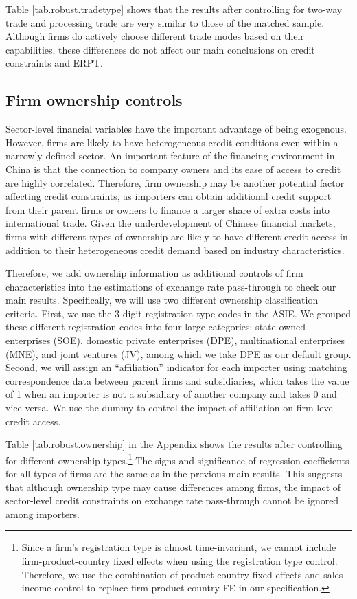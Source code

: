 Table \ref{tab.robust.tradetype} shows that the results after controlling for two-way trade and processing trade are very similar to those of the matched sample. Although firms do actively choose different trade modes based on their capabilities, these differences do not affect our main conclusions on credit constraints and ERPT.

\subsection{Firm ownership controls}

Sector-level financial variables have the important advantage of being exogenous. However, firms are likely to have heterogeneous credit conditions even within a narrowly defined sector. An important feature of the financing environment in China is that the connection to company owners and its ease of access to credit are highly correlated. Therefore, firm ownership may be another potential factor affecting credit constraints, as importers can obtain additional credit support from their parent firms or owners to finance a larger share of extra costs into international trade. Given the underdevelopment of Chinese financial markets, firms with different types of ownership are likely to have different credit access in addition to their heterogeneous credit demand based on industry characteristics. 

Therefore, we add ownership information as additional controls of firm characteristics into the estimations of exchange rate pass-through to check our main results. Specifically, we will use two different ownership classification criteria. First, we use the 3-digit registration type codes in the ASIE. We grouped these different registration codes into four large categories: state-owned enterprises (SOE), domestic private enterprises (DPE), multinational enterprises (MNE), and joint ventures (JV), among which we take DPE as our default group. Second, we will assign an ``affiliation'' indicator for each importer using matching correspondence data between parent firms and subsidiaries, which takes the value of 1 when an importer is not a subsidiary of another company and takes 0 and vice versa. We use the dummy to control the impact of affiliation on firm-level credit access.

Table \ref{tab.robust.ownership} in the Appendix shows the results after controlling for different ownership types.\footnote{Since a firm's registration type is almost time-invariant, we cannot include firm-product-country fixed effects when using the registration type control. Therefore, we use the combination of product-country fixed effects and sales income control to replace firm-product-country FE in our specification.} The signs and significance of regression coefficients for all types of firms are the same as in the previous main results. This suggests that although ownership type may cause differences among firms, the impact of sector-level credit constraints on exchange rate pass-through cannot be ignored among importers.

